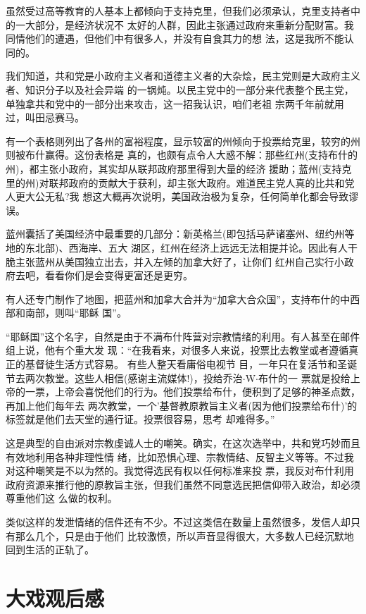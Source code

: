 ﻿\documentclass[11pt]{article}
\begin{document}
虽然受过高等教育的人基本上都倾向于支持克里，但我们必须承认，克里支持者中的一大部分，是经济状况不
太好的人群，因此主张通过政府来重新分配财富。我同情他们的遭遇，但他们中有很多人，并没有自食其力的想
法，这是我所不能认同的。

我们知道，共和党是小政府主义者和道德主义者的大杂烩，民主党则是大政府主义者、知识分子以及社会异端
的一锅炖。以民主党中的一部分来代表整个民主党，单独拿共和党中的一部分出来攻击，这一招我认识，咱们老祖
宗两千年前就用过，叫田忌赛马。

有一个表格则列出了各州的富裕程度，显示较富的州倾向于投票给克里，较穷的州则被布什赢得。这份表格是
真的，也颇有点令人大惑不解：那些红州(支持布什的州)，都主张小政府，其实却从联邦政府那里得到大量的经济
援助；蓝州(支持克里的州)对联邦政府的贡献大于获利，却主张大政府。难道民主党人真的比共和党人更大公无私?我
想这大概再次说明，美国政治极为复杂，任何简单化都会导致谬误。

蓝州囊括了美国经济中最重要的几部分：新英格兰(即包括马萨诸塞州、纽约州等地的东北部)、西海岸、五大
湖区，红州在经济上远远无法相提并论。因此有人干脆主张蓝州从美国独立出去，并入左倾的加拿大好了，让你们
红州自己实行小政府去吧，看看你们是会变得更富还是更穷。

有人还专门制作了地图，把蓝州和加拿大合并为``加拿大合众国''，支持布什的中西部和南部，则叫``耶稣
国''。

``耶稣国''这个名字，自然是由于不满布什阵营对宗教情绪的利用。有人甚至在邮件组上说，他有个重大发
现：``在我看来，对很多人来说，投票比去教堂或者遵循真正的基督徒生活方式容易。 有些人整天看庸俗电视节
目，一年只在复活节和圣诞节去两次教堂。这些人相信(感谢主流媒体!)，投给乔治$\cdot$W$\cdot$布什的一
票就是投给上帝的一票，上帝会喜悦他们的行为。他们投票给布什，便积到了足够的神圣点数，再加上他们每年去
两次教堂，一个'基督教原教旨主义者(因为他们投票给布什)'的标签就是他们去天堂的通行证。投票很容易，思考
却难得多。''

这是典型的自由派对宗教虔诚人士的嘲笑。确实，在这次选举中，共和党巧妙而且有效地利用各种非理性情
绪，比如恐惧心理、宗教情结、反智主义等等。不过我对这种嘲笑是不以为然的。我觉得选民有权以任何标准来投
票，我反对布什利用政府资源来推行他的原教旨主张，但我们虽然不同意选民把信仰带入政治，却必须尊重他们这
么做的权利。


类似这样的发泄情绪的信件还有不少。不过这类信在数量上虽然很多，发信人却只有那么几个，只是由于他们
比较激愤，所以声音显得很大，大多数人已经沉默地回到生活的正轨了。

\section{大戏观后感}
\end{document}
